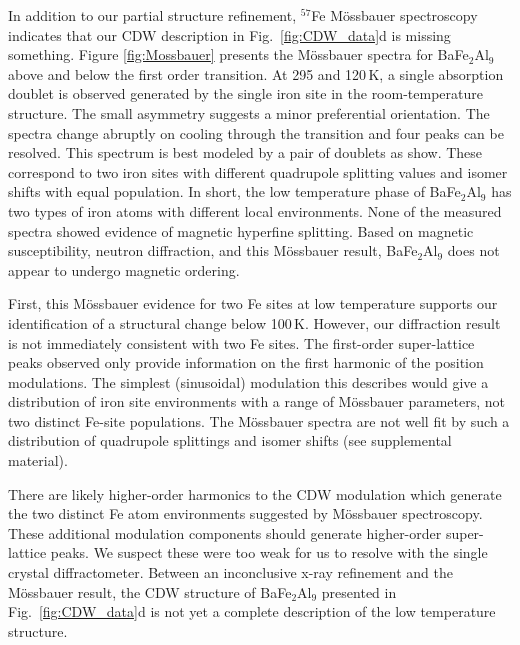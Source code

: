 \documentclass[journal=cmatex,manuscript=article]{achemso}
\begin{document}
\label{sec:Results_Moss}
In addition to our partial structure refinement, $^{57}$Fe M\"ossbauer spectroscopy indicates that our CDW description in Fig.~\ref{fig:CDW_data}d is missing something. Figure \ref{fig:Mossbauer} presents the M\"ossbauer spectra for BaFe$_2$Al$_9$ above and below the first order transition. At 295 and 120\,K, a single absorption doublet is observed generated by the single iron site in the room-temperature structure. The small asymmetry suggests a minor preferential orientation. The spectra change abruptly on cooling through the transition and four peaks can be resolved. 
This spectrum is best modeled by a pair of doublets as show. These correspond to two iron sites with different quadrupole splitting values and isomer shifts with equal population.
In short, the low temperature phase of BaFe$_2$Al$_9$ has two types of iron atoms with different local environments. None of the measured spectra showed evidence of magnetic hyperfine splitting. Based on magnetic susceptibility, neutron diffraction, and this M\"ossbauer result, BaFe$_2$Al$_9$ does not appear to undergo magnetic ordering.

First, this M\"ossbauer evidence for two Fe sites at low temperature supports our identification of a structural change below 100\,K. 
However, our diffraction result is not immediately consistent with two Fe sites. The first-order super-lattice peaks observed only provide information on the first harmonic of the position modulations. The simplest (sinusoidal) modulation this describes would give a distribution of iron site environments with a range of M\"ossbauer parameters, not two distinct Fe-site populations. The M\"ossbauer spectra are not well fit by such a distribution of quadrupole splittings and isomer shifts (see supplemental material). 

There are likely higher-order harmonics to the CDW modulation which generate the two distinct Fe atom environments suggested by M\"ossbauer spectroscopy. These additional modulation components should generate higher-order super-lattice peaks\cite{Boucher1996_IncommensurateStructureTaGeTe2}. We suspect these were too weak for us to resolve with the single crystal diffractometer. Between an inconclusive x-ray refinement and the M\"ossbauer result, the CDW structure of BaFe$_2$Al$_9$ presented in Fig.~\ref{fig:CDW_data}d is not yet a complete description of the low temperature structure.
\end{document}
